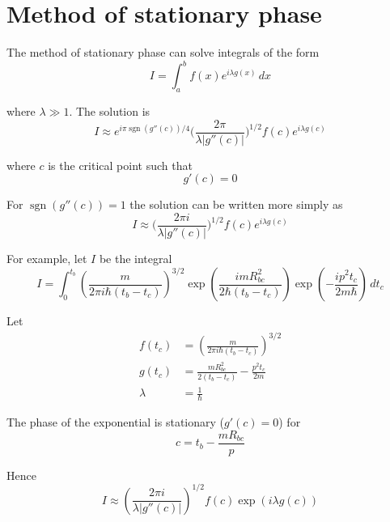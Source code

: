 \documentclass[12pt]{article}
\begin{document}
\section*{Method of stationary phase}
The method of stationary phase can solve
integrals of the form
$$
I=\int_a^b f(x)e^{i\lambda g(x)}\,dx
$$

where $\lambda\gg1$.
The solution is
$$
I\approx e^{i\pi\operatorname{sgn}(g''(c))/4}
\biggl(\frac{2\pi}{\lambda|g''(c)|}\biggr)^{1/2}
f(c)e^{i\lambda g(c)}
$$

where $c$ is the critical point such that
$$
g'(c)=0
$$

For $\operatorname{sgn}(g''(c))=1$ the solution
can be written more simply as
$$
I\approx
\biggl(\frac{2\pi i}{\lambda|g''(c)|}\biggr)^{1/2}
f(c)e^{i\lambda g(c)}
$$

For example, let $I$ be the integral
$$
I=\int_0^{t_b}
\left(\frac{m}{2\pi i\hbar(t_b-t_c)}\right)^{3/2}
\exp\left(\frac{imR_{bc}^2}{2\hbar(t_b-t_c)}\right)
\exp\left(-\frac{ip^2t_c}{2m\hbar}\right)
\,dt_c
$$

Let
\begin{align*}
f(t_c)&=\left(\frac{m}{2\pi i\hbar(t_b-t_c)}\right)^{3/2}
\\
g(t_c)&=\frac{m R_{bc}^2}{2(t_b-t_c)}-\frac{p^2t_c}{2m}
\\
\lambda&=\frac{1}{\hbar}
\end{align*}

The phase of the exponential is stationary ($g'(c)=0$) for
$$
c=t_b-\frac{mR_{bc}}{p}
$$

Hence
\begin{equation*}
I\approx\left(\frac{2\pi i}{\lambda|g''(c)|}\right)^{1/2}
f(c)\exp(i\lambda g(c))
\end{equation*}
\end{document}
